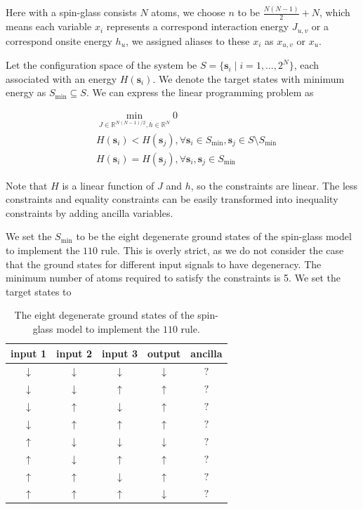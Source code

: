 \documentclass[twocolumn,superscriptaddress,english,showpacs,longbibliography]{revtex4-2}
\begin{document}
Here with a spin-glass consists $N$ atoms, we choose $n$ to be $\frac{N(N-1)}{2} + N$, which means each variable $x_i$ represents a correspond interaction energy $J_{u, v}$ or a correspond onsite energy $h_u$, we assigned aliases to these $x_i$ as $x_{u,v}$ or $x_{u}$.

Let the configuration space of the system be $S = \{\mathbf s_i\mid i=1,\ldots, 2^N\}$, each associated with an energy $H(\mathbf s_i)$. We denote the target states with minimum energy as $S_{\text{min}} \subseteq S$. We can express the linear programming problem as

\begin{equation}
    \begin{split}
        &\min_{J \in \mathbb{R}^{N(N{-}1)/2}, h\in \mathbb{R}^N} 0\\
        &H(\mathbf s_i) < H(\mathbf s_j), \forall \mathbf s_i \in S_{\text{min}}, \mathbf s_j \in S \setminus S_{\text{min}}\\
        &H(\mathbf s_i) = H(\mathbf s_j), \forall \mathbf s_i, \mathbf s_j \in S_{\text{min}}
    \end{split}
\end{equation}

Note that $H$ is a linear function of $J$ and $h$, so the
constraints are linear. The less constraints and equality constraints
can be easily transformed into inequality constraints by adding ancilla
variables.

We set the $S_{\text{min}}$ to be the eight degenerate ground states of the spin-glass model to implement the $110$ rule.
This is overly strict, as we do not consider the case that the ground states for different input signals to have degeneracy.
The minimum number of atoms required to satisfy the
constraints is 5. We set the target states to

\begin{table}[H]
    \centering
\begin{tabular}{|c|c|c|c|c|}
\hline
input 1 & input 2 & input 3 & output & ancilla \\
\hline
$\downarrow$ & $\downarrow$ & $\downarrow$ & $\downarrow$ & $?$ \\
$\downarrow$ & $\downarrow$ & $\uparrow$ & $\uparrow$ & $?$ \\
$\downarrow$ & $\uparrow$ & $\downarrow$ & $\uparrow$ & $?$ \\
$\downarrow$ & $\uparrow$ & $\uparrow$ & $\uparrow$ & $?$ \\
$\uparrow$ & $\downarrow$ & $\downarrow$ & $\downarrow$ & $?$ \\
$\uparrow$ & $\downarrow$ & $\uparrow$ & $\uparrow$ & $?$ \\
$\uparrow$ & $\uparrow$ & $\downarrow$ & $\uparrow$ & $?$ \\
$\uparrow$ & $\uparrow$ & $\uparrow$ & $\downarrow$ & $?$ \\
\hline
\end{tabular}
\caption{The eight degenerate ground states of the spin-glass model to implement the $110$ rule.}
\end{table}
\end{document}
